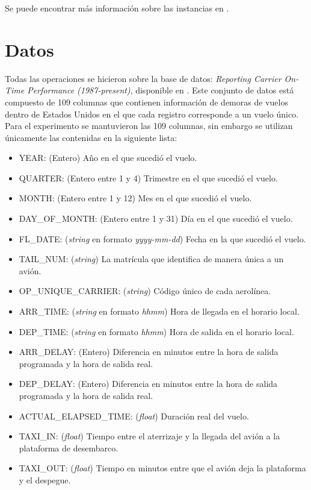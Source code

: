 Se puede encontrar más información sobre las instancias en \cite{ec2-instances}.

\section{Datos}

Todas las operaciones se hicieron sobre la base de datos: 
\textit{Reporting Carrier On-Time Performance (1987-present)}, disponible en \cite{linktranstat}. Este conjunto de datos está compuesto de 109 columnas que contienen información de demoras de vuelos dentro de Estados Unidos en el que cada registro corresponde a un vuelo único. Para el experimento se mantuvieron las 109 columnas, sin embargo se utilizan únicamente las contenidas en la siguiente lista:

\begin{itemize}
	\item YEAR: (Entero) Año en el que sucedió el vuelo.
	\item QUARTER: (Entero entre 1 y 4) Trimestre en el que sucedió el vuelo.
	\item MONTH: (Entero entre 1 y 12) Mes en el que sucedió el vuelo.
	\item DAY\_OF\_MONTH: (Entero entre 1 y 31) Día en el que sucedió el vuelo.
	\item FL\_DATE: (\textit{string} en formato \textit{yyyy-mm-dd}) Fecha en la que sucedió el vuelo.
	\item TAIL\_NUM: (\textit{string}) La matrícula que identifica de manera única a un avión.
	\item OP\_UNIQUE\_CARRIER: (\textit{string}) Código único de cada aerolínea.
	\item ARR\_TIME: (\textit{string} en formato \textit{hhmm}) Hora de llegada en el horario local.
	\item DEP\_TIME: (\textit{string} en formato \textit{hhmm}) Hora de salida en el horario local.
	\item ARR\_DELAY: (Entero) Diferencia en minutos entre la hora de salida programada y la hora de salida real.
	\item DEP\_DELAY: (Entero) Diferencia en minutos entre la hora de salida programada y la hora de salida real.
	\item ACTUAL\_ELAPSED\_TIME: (\textit{float}) Duración real del vuelo.
	\item TAXI\_IN: (\textit{float}) Tiempo entre el aterrizaje y la llegada del avión a la plataforma de desembarco.
	\item TAXI\_OUT: (\textit{float}) Tiempo en minutos entre que el avión deja la plataforma y el despegue.

\end{itemize}
